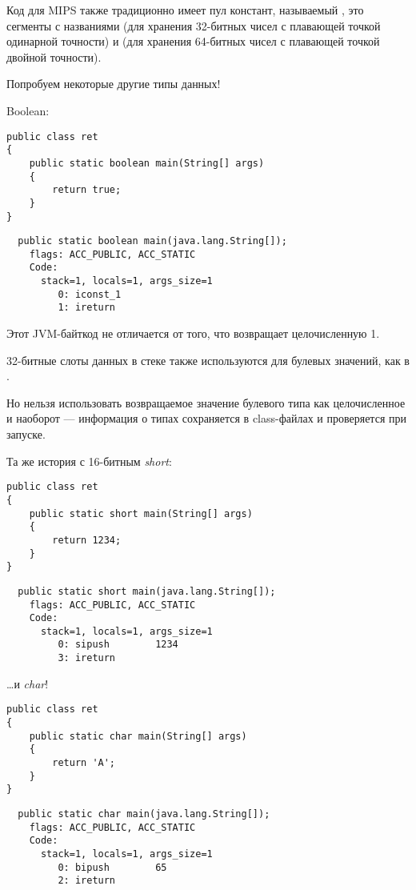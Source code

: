 Код для MIPS также традиционно имеет пул констант, называемый , это сегменты
с названиями  (для хранения 32-битных чисел с плавающей точкой одинарной точности) и
(для хранения 64-битных чисел с плавающей точкой двойной точности).

Попробуем некоторые другие типы данных!

Boolean:

\begin{lstlisting}[style=customjava]
public class ret
{
	public static boolean main(String[] args) 
	{
		return true;
	}
}
\end{lstlisting}

\begin{lstlisting}
  public static boolean main(java.lang.String[]);
    flags: ACC_PUBLIC, ACC_STATIC
    Code:
      stack=1, locals=1, args_size=1
         0: iconst_1      
         1: ireturn       
\end{lstlisting}

Этот JVM-байткод не отличается от того, что возвращает целочисленную 1.

32-битные слоты данных в стеке также используются для булевых значений, как в \CCpp.

Но нельзя использовать возвращаемое значение булевого типа как целочисленное и наоборот --- информация 
о типах сохраняется в class-файлах и проверяется при запуске.

Та же история с 16-битным \emph{short}:

\begin{lstlisting}[style=customjava]
public class ret
{
	public static short main(String[] args) 
	{
		return 1234;
	}
}
\end{lstlisting}

\begin{lstlisting}
  public static short main(java.lang.String[]);
    flags: ACC_PUBLIC, ACC_STATIC
    Code:
      stack=1, locals=1, args_size=1
         0: sipush        1234
         3: ireturn       
\end{lstlisting}

\dots и \emph{char}!

\begin{lstlisting}[style=customjava]
public class ret
{
	public static char main(String[] args) 
	{
		return 'A';
	}
}
\end{lstlisting}

\begin{lstlisting}
  public static char main(java.lang.String[]);
    flags: ACC_PUBLIC, ACC_STATIC
    Code:
      stack=1, locals=1, args_size=1
         0: bipush        65
         2: ireturn       
\end{lstlisting}

